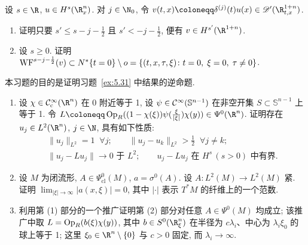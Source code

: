 \begin{exer}\label{ex:6.6}
设 $s \in \R$, $u \in H^s(\R^n_x)$. 对 $j \in \N_0$, 令 $v(t, x) \defeq \delta^{(j)}(t) u(x) \in \Distr(\R^{1+n}_{t, x})$.
\begin{enumerate}
    \item 证明只要 $s' \le s - j - \tfrac{1}{2}$ 且 $s' < -j - \tfrac{1}{2}$, 便有 $v \in H^{s'}(\R^{1+n})$.
    \item 设 $s \ge 0$. 证明 $\operatorname{WF}^{s-j-\frac{1}{2}}(v) \subset N^*\{t = 0\} \setminus o = \{(t, x, \tau, \xi) \colon t = 0, \; \xi = 0, \; \tau \neq 0\}$.
\end{enumerate}
\end{exer}

\begin{exer}[紧算子]\label{ex:6.7}
本习题的目的是证明习题~\ref{ex:5.31} 中结果的逆命题.
\begin{enumerate}
    \item 设 $\chi \in \SmoothComp(\R^n)$ 在 0 附近等于 1, 设 $\psi \in \mathcal{C}^\infty(\mathbb{S}^{n-1})$ 在非空开集 $S \subset \mathbb{S}^{n-1}$ 上等于 1. 令 $L \defeq \OpR((1 - \chi(\xi))\psi(\frac{\xi}{|\xi|})\chi(y)) \in \Psi^0(\R^n)$. 证明存在 $u_j \in L^2(\R^n)$, $j \in \N$, 具有如下性质:
    \begin{equation}\label{eq:6.125}
    \begin{gathered}
        \|u_j\|_{L^2} = 1 \;\; \forall j; \qquad \|u_j - u_k\|_{L^2} > \tfrac{1}{2} \;\; \forall j \neq k; \\
        \|u_j - L u_j\| \to 0 \text{ 于 } L^2; \qquad u_j - L u_j \text{ 在 } H^s \, (s > 0) \text{ 中有界}.
    \end{gathered}
    \end{equation}
    \item 设 $M$ 为闭流形, $A \in \Psi^0_{\mathrm{cl}}(M)$, $a = \sigma^0(A)$. 设 $A \colon L^2(M) \to L^2(M)$ 紧. 证明 $\lim_{|\xi| \to \infty}|a(x, \xi)| = 0$, 其中 $|\cdot|$ 表示 $T^* M$ 的纤维上的一个范数.
    \item 利用第 (1) 部分的一个推广证明第 (2) 部分对任意 $A \in \Psi^0(M)$ 均成立; 该推广中取 $L = \operatorname{Op}_R(b(\xi)\chi(y))$, 其中 $b \in S^0(\R^n_\xi)$ 在半径为 $c\lambda_i$、中心为 $\lambda_i\xi_0$ 的球上等于 1; 这里 $\xi_0 \in \R^n \setminus \{0\}$ 与 $c > 0$ 固定, 而 $\lambda_i \to \infty$.
\end{enumerate}
\end{exer}

